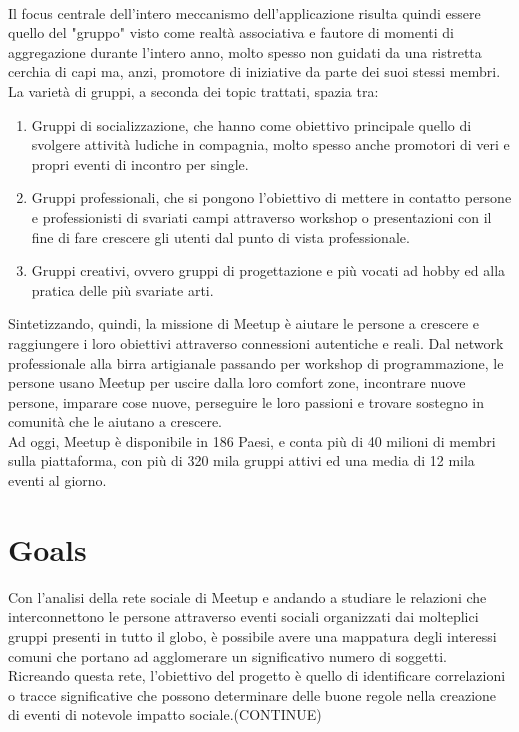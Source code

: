 \documentclass[fleqn,10pt]{SelfArx} %
\begin{document}
{\\
Il focus centrale dell'intero meccanismo dell'applicazione risulta quindi essere quello del "gruppo" visto come realtà associativa e fautore di momenti di aggregazione durante l'intero anno, molto spesso non guidati da una ristretta cerchia di capi ma, anzi, promotore di iniziative da parte dei suoi stessi membri. La varietà di gruppi, a seconda dei topic trattati, spazia tra:
\begin{enumerate}
\item Gruppi di socializzazione, che hanno come obiettivo principale quello di svolgere attività ludiche in compagnia, molto spesso anche promotori di veri e propri eventi di incontro per single.
\item Gruppi professionali, che si pongono l'obiettivo di mettere in contatto persone e professionisti di svariati campi attraverso workshop o presentazioni con il fine di fare crescere gli utenti dal punto di vista professionale.
\item Gruppi creativi, ovvero gruppi di progettazione e più vocati ad hobby ed alla pratica delle più svariate arti.
\end{enumerate}
Sintetizzando, quindi, la missione di Meetup è aiutare le persone a crescere e raggiungere i loro obiettivi attraverso connessioni autentiche e reali. Dal network professionale alla birra artigianale passando per workshop di programmazione, le persone usano Meetup per uscire dalla loro comfort zone, incontrare nuove persone, imparare cose nuove, perseguire le loro passioni e trovare sostegno in comunità che le aiutano a crescere.\\
Ad oggi, Meetup è disponibile in 186 Paesi, e conta più di 40 milioni di membri sulla piattaforma, con più di 320 mila gruppi attivi ed una media di 12 mila eventi al giorno.
}

\section{Goals}
{\footnotesize
Con l'analisi della rete sociale di Meetup e andando a studiare le relazioni che interconnettono le persone attraverso eventi sociali organizzati dai molteplici gruppi presenti in tutto il globo, è possibile avere una mappatura degli interessi comuni che portano ad agglomerare un significativo numero di soggetti.
Ricreando questa rete, l'obiettivo del progetto è quello di identificare correlazioni o tracce significative che possono determinare delle buone regole nella creazione di eventi di notevole impatto sociale.(CONTINUE)%
}
\end{document}
